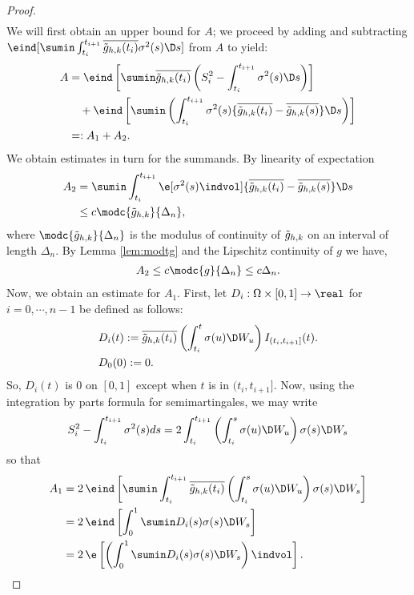 \begin{appendices}
\begin{proof}
\begin{align}
\end{align}
We will first obtain an upper bound for $A$; we proceed by adding and subtracting $\eind [\sumin\int_{t_i}^{t_{i+1}}\btghki \sigma^2(s)  \D s]$  from  $A$ to yield: 
\begin{align}
  A & = \eind\left[\sumin\btghki \left(S_i^2 -\int_{t_i}^{t_{i+1}} \sigma^2(s) \D s\right)\right ]\notag \\
  &\quad +  \eind\left[\sumin\left(\int_{t_i}^{t_{i+1}} \sigma^2(s) \{\btghki - \btghks\} \D s\right) \right]\notag\\
  &=:A_{1} + A_{2} \notag.
  \label{}
\end{align}
We obtain estimates in turn for the summands. By linearity of expectation 
\begin{align}
  A_{2} &= \sumin \int_{t_i}^{t_{i+1}} \e[\sigma^2(s) \indvol] \{\btghki - \btghks\} \D s\notag\\
  &\le c\modc{\tghk}{\Delta_n},\notag
  \label{}
\end{align}
where $\modc{\tghk}{\Delta_n}$ is the modulus of continuity of $\tilde{g}_{h,k}$ on an interval of length $\Delta_n$. By  Lemma \eqref{lem:modtg} and the Lipschitz continuity of $g$ we have, 
\begin{align}
  A_{2} \le c\modc{g}{\Delta_n} \le c \Delta_n.\notag \\
  \label{}
\end{align}
Now, we obtain an estimate for $A_{1}$. First, let $D_i: \Omega\times[0,1] \to \real$ for $i = 0, \cdots, n-1$ be defined as follows:  
\begin{align}
&D_{i}(t) := \btghki\left(\int_{t_i}^{t} \sigma(u)\D W_u\right)I_{(t_i, t_{i+1}]}(t).
  \label{eq:Di}\\
&D_0(0) := 0.
\end{align}
So, $D_i(t)$ is 0 on $[0,1]$ except when $t$ is in $(t_i, t_{i+1}]$. Now, using the integration by parts formula for semimartingales, we may write
\begin{align}
  S^2_i - \int^{t_{i+ 1}}_{t_i} \sigma^2(s) d s = 2\int_{t_i}^{t_{i+1}}\left(\int_{t_i}^{s} \sigma(u)\D W_u\right)\sigma(s) \D W_s\notag
  \label{}
\end{align}
so that 
\begin{align}
  A_1 &= 2\,\eind\left[\sumin\int_{t_i}^{t_{i+1}}\btghki\left(\int_{t_i}^{s} \sigma(u)\D W_u\right)\sigma(s) \D W_s\right ]\notag \\
  &=2\,\eind\left[\int_0^1\sumin D_i(s) \sigma(s) \D W_s \right]\notag\\
  &=2\,\e\left[\left(\int_0^1\sumin D_i(s) \sigma(s) \D W_s\right)\indvol \right]\notag.

\end{align}
\end{proof}
\end{appendices}
